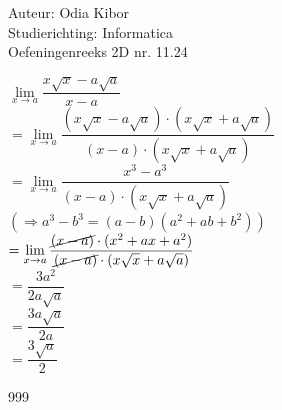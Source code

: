 \documentclass[a4paper]{article}
\begin{document}
  
\noindent \large Auteur: Odia Kibor \\
\noindent \large Studierichting: Informatica\\
\noindent \large Oefeningenreeks 2D nr. 11.24\\

\medskip

\normalsize


$\lim\limits_{x \rightarrow a} \dfrac{x\sqrt{x} - a\sqrt{a}}{x-a}$\\

$= \lim\limits_{x \rightarrow a} \dfrac{(x\sqrt{x} - a\sqrt{a})\cdot(x\sqrt{x} + a\sqrt{a})}{(x-a)\cdot(x\sqrt{x} + a\sqrt{a})}$\\

$= \lim\limits_{x \rightarrow a} \dfrac{x^3 - a^3}{(x-a)\cdot(x\sqrt{x} + a\sqrt{a})}$\\

$(\Rightarrow a^3 - b^3 = (a-b)(a^2 + ab + b^2))$\\

$= \lim\limits_{x \rightarrow a} \dfrac{\cancel{(x-a)}\cdot(x^2 + ax + a^2)}{\cancel{(x-a)}\cdot(x\sqrt{x} + a\sqrt{a})}$\\

$=\dfrac{3a^2}{2a\sqrt{a}}$\\

$=\dfrac{3a\sqrt{a}}{2a}$\\

$=\dfrac{3\sqrt{a}}{2}$













\begin{thebibliography}{999}
\end{thebibliography}
\end{document}
